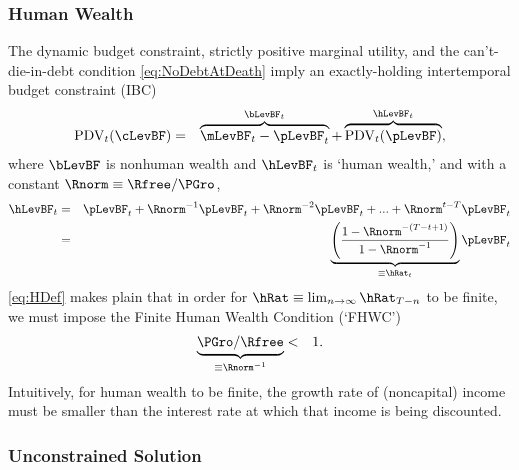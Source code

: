 \documentclass[titlepage]{\econtex}\providecommand{\texname}{BufferStockTheory}
\begin{document}
\subsubsection{Human Wealth}
The dynamic budget constraint, strictly positive marginal utility, and the can't-die-in-debt condition \eqref{eq:NoDebtAtDeath} imply an exactly-holding intertemporal budget constraint (IBC)
\begin{eqnarray}
  \text{PDV}_{t}(\cLevBF) & = & \overbrace{\mLevBF_{t}-\pLevBF_{t}}^{\bLevBF_{t}}+\overbrace{\text{PDV}_{t}(\pLevBF)}^{\hLevBF_{t}}, \label{eq:IBCFinite}
\end{eqnarray}
where $\bLevBF$ is nonhuman wealth and $\hLevBF_{t}$ is `human wealth,' and with a constant $\Rnorm \equiv \Rfree/\PGro$,
\begin{eqnarray}
  \hLevBF_{t} &  = & \pLevBF_{t}+\Rnorm^{-1} \pLevBF_{t} + \Rnorm^{-2} \pLevBF_{t} + ... + \Rnorm^{t-T} \pLevBF_{t} \notag
\\ & = & \underbrace{\left(\frac{1-\Rnorm^{-(T-t+1)}}{1-\Rnorm^{-1}}\right)}_{\equiv \hRat_{t}}\pLevBF_{t} \label{eq:HDef}
\end{eqnarray}
\eqref{eq:HDef} makes plain that in order for $\hRat \equiv \lim_{n \rightarrow
  \infty} \hRat_{T-n}$ to be finite, we must
impose the Finite Human Wealth Condition (`FHWC') \hypertarget{FHWC}{}
\begin{eqnarray}
  \underbrace{\PGro/\Rfree}_{\equiv \Rnorm^{-1}} & < & 1 \label{eq:FHWC}.
\end{eqnarray}
Intuitively, for human wealth to be finite, the growth rate of (noncapital) income must be smaller than
the interest rate at which that income is being discounted.

\hypertarget{Unconstrained-Solution}{}
\subsubsection{Unconstrained Solution} \label{subsec:PFUncon}
\end{document}

